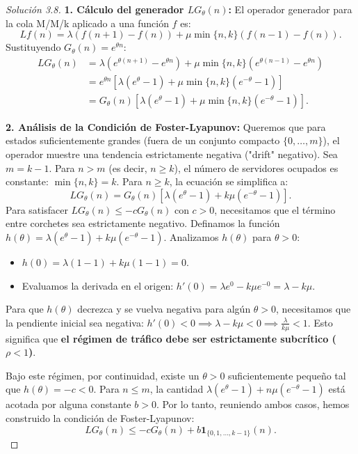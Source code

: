 \documentclass[10pt,a4paper]{article}
\begin{document}
\begin{proof}[Solución 3.8]
    \textbf{1. Cálculo del generador $L G_\theta(n)$:}
    El operador generador para la cola M/M/k aplicado a una función $f$ es:
    \[ Lf(n) = \lambda(f(n+1) - f(n)) + \mu \min\{n, k\}(f(n-1) - f(n)). \]
    Sustituyendo $G_\theta(n) = e^{\theta n}$:
    \begin{align*}
        L G_\theta(n) &= \lambda(e^{\theta(n+1)} - e^{\theta n}) + \mu \min\{n, k\}(e^{\theta(n-1)} - e^{\theta n}) \\
        &= e^{\theta n} \left[ \lambda(e^\theta - 1) + \mu \min\{n, k\}(e^{-\theta} - 1) \right] \\
        &= G_\theta(n) \left[ \lambda(e^\theta - 1) + \mu \min\{n, k\}(e^{-\theta} - 1) \right].
    \end{align*}

    \textbf{2. Análisis de la Condición de Foster-Lyapunov:}
    Queremos que para estados suficientemente grandes (fuera de un conjunto compacto $\{0, \dots, m\}$), el operador muestre una tendencia estrictamente negativa ("drift" negativo).
    Sea $m = k-1$. Para $n > m$ (es decir, $n \ge k$), el número de servidores ocupados es constante: $\min\{n, k\} = k$.
    Para $n \ge k$, la ecuación se simplifica a:
    \[ L G_\theta(n) = G_\theta(n) \left[ \lambda(e^\theta - 1) + k\mu(e^{-\theta} - 1) \right]. \]
    Para satisfacer $L G_\theta(n) \le -c G_\theta(n)$ con $c > 0$, necesitamos que el término entre corchetes sea estrictamente negativo. Definamos la función $h(\theta) = \lambda(e^\theta - 1) + k\mu(e^{-\theta} - 1)$.
    Analizamos $h(\theta)$ para $\theta > 0$:
    \begin{itemize}
        \item $h(0) = \lambda(1-1) + k\mu(1-1) = 0$.
        \item Evaluamos la derivada en el origen: $h'(0) = \lambda e^0 - k\mu e^{-0} = \lambda - k\mu$.
    \end{itemize}
    Para que $h(\theta)$ decrezca y se vuelva negativa para algún $\theta > 0$, necesitamos que la pendiente inicial sea negativa: $h'(0) < 0 \implies \lambda - k\mu < 0 \implies \frac{\lambda}{k\mu} < 1$.
    Esto significa que \textbf{el régimen de tráfico debe ser estrictamente subcrítico ($\rho < 1$)}. 
    
    Bajo este régimen, por continuidad, existe un $\theta > 0$ suficientemente pequeño tal que $h(\theta) = -c < 0$. 
    Para $n \le m$, la cantidad $\lambda(e^\theta - 1) + n\mu(e^{-\theta} - 1)$ está acotada por alguna constante $b > 0$.
    Por lo tanto, reuniendo ambos casos, hemos construido la condición de Foster-Lyapunov:
    \[ L G_\theta(n) \le -c G_\theta(n) + b \mathbf{1}_{\{0,1,\dots,k-1\}}(n). \]


\end{proof}
\end{document}
